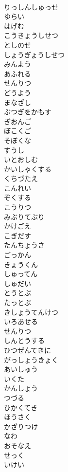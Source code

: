 \documentclass[8pt]{extreport}
\begin{document}
\begin{CJK}{UTF8}{min}
\\	りっしんしゅっせ
\\	ゆらい
\\	はげむ
\\	こうきょうしせつ
\\	としのせ
\\	しょうぎょうしせつ
\\	みんよう
\\	あふれる
\\	せんりつ
\\	どうよう
\\	まなざし
\\	ぶつぎをかもす
\\	ぎおんご
\\	ぼこくご
\\	そぼくな
\\	すうし
\\	いとおしむ
\\	かいしゃくする
\\	くちづたえ
\\	こんれい
\\	ぞくする
\\	こうりつ
\\	みぶりてぶり
\\	かけごえ
\\	こぎだす
\\	たんちょうさ
\\	ごっかん
\\	きょうくん
\\	しゅってん
\\	しゅだい
\\	とうとぶ 
\\	たっとぶ
\\	きしょうてんけつ
\\	いろあせる
\\	せんりつ
\\	しんとうする
\\	ひつぜんてきに
\\	がっしょうきょく
\\	あいしゅう
\\	いくた
\\	かんしょう
\\	つづる
\\	ひかくてき
\\	ほうさく
\\	かざりつけ
\\	なわ
\\	おそなえ
\\	せっく
\\	いけい

\end{CJK}
\end{document}
